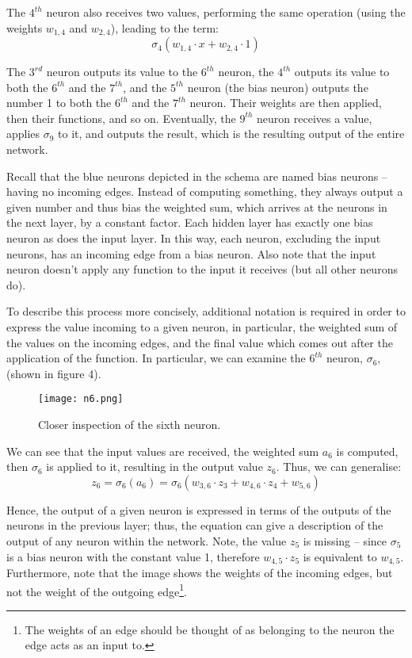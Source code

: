 \documentclass[11pt]{article}
\begin{document}
The $4^{th}$ neuron also receives two values, performing the same operation (using the weights $w_{1, 4}$ and $w_{2, 4}$), leading to the term: 
\begin{equation}\sigma_{4}(w_{1, 4}\cdot x + w_{2, 4}\cdot 1)\end{equation}

The $3^{rd}$ neuron outputs its value to the $6^{th}$ neuron, the $4^{th}$ outputs its value to both the $6^{th}$ and the $7^{th}$, and the $5^{th}$ neuron (the bias neuron) outputs the number 1 to both the $6^{th}$ and the $7^{th}$ neuron. Their weights are then applied, then their functions, and so on. Eventually, the $9^{th}$ neuron receives a value, applies $\sigma_{9}$ to it, and outputs the result, which is the resulting output of the entire network.

Recall that the blue neurons depicted in the schema are named bias neurons – having no incoming edges. Instead of computing something, they always output a given number and thus bias the weighted sum, which arrives at the neurons in the next layer, by a constant factor. Each hidden layer has exactly one bias neuron as does the input layer. In this way, each neuron, excluding the input neurons, has an incoming edge from a bias neuron. Also note that the input neuron doesn't apply any function to the input it receives (but all other neurons do).

To describe this process more concisely, additional notation is required in order to express the value incoming to a given neuron, in particular, the weighted sum of the values on the incoming edges, and the final value which comes out after the application of the function. In particular, we can examine the $6^{th}$ neuron, $\sigma_{6}$, (shown in figure 4).

\begin{figure}[h]
    \centering
    \texttt{[image: n6.png]}
    \caption{Closer inspection of the sixth neuron.}   
\end{figure}

We can see that the input values are received, the weighted sum $a_{6}$ is computed, then $\sigma_{6}$ is applied to it, resulting in the output value $z_{6}$. Thus, we can generalise: 
\begin{equation}z_{6} = \sigma_{6}(a_{6})=\sigma_{6}(w_{3,6}\cdot z_{3}+w_{4,6}\cdot z_{4}+w_{5,6}) \nonumber\end{equation}

Hence, the output of a given neuron is expressed in terms of the outputs of the neurons in the previous layer; thus, the equation can give a description of the output of any neuron within the network. Note, the value $z_{5}$ is missing – since $\sigma_{5}$ is a bias neuron with the constant value 1, therefore $w_{4,5}\cdot z_{5}$ is equivalent to $w_{4,5}$. Furthermore, note that the image shows the weights of the incoming edges, but not the weight of the outgoing edge\footnote{The weights of an edge should be thought of as belonging to the neuron the edge acts as an input to.}.
\end{document}
